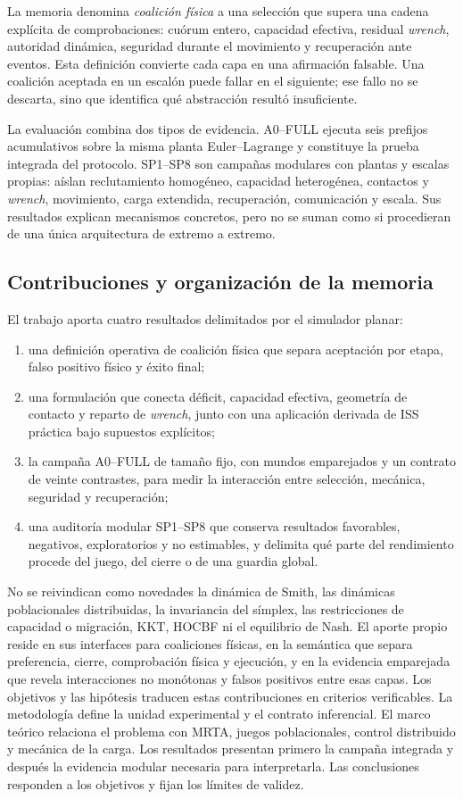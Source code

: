 La memoria denomina \emph{coalición física} a una selección que supera una cadena explícita de comprobaciones: cuórum entero, capacidad efectiva, residual \emph{wrench}, autoridad dinámica, seguridad durante el movimiento y recuperación ante eventos. Esta definición convierte cada capa en una afirmación falsable. Una coalición aceptada en un escalón puede fallar en el siguiente; ese fallo no se descarta, sino que identifica qué abstracción resultó insuficiente.

La evaluación combina dos tipos de evidencia. A0--FULL ejecuta seis prefijos acumulativos sobre la misma planta Euler--Lagrange y constituye la prueba integrada del protocolo. SP1--SP8 son campañas modulares con plantas y escalas propias: aíslan reclutamiento homogéneo, capacidad heterogénea, contactos y \emph{wrench}, movimiento, carga extendida, recuperación, comunicación y escala. Sus resultados explican mecanismos concretos, pero no se suman como si procedieran de una única arquitectura de extremo a extremo.



\subsection{Contribuciones y organización de la memoria}

El trabajo aporta cuatro resultados delimitados por el simulador planar:
\begin{enumerate}[label=A\arabic*.,leftmargin=2.2em]
  \item una definición operativa de coalición física que separa aceptación por etapa, falso positivo físico y éxito final;
  \item una formulación que conecta déficit, capacidad efectiva, geometría de contacto y reparto de \emph{wrench}, junto con una aplicaci\'on derivada de ISS pr\'actica bajo supuestos expl\'icitos;
  \item la campaña A0--FULL de tamaño fijo, con mundos emparejados y un contrato de veinte contrastes, para medir la interacción entre selección, mecánica, seguridad y recuperación;
  \item una auditoría modular SP1--SP8 que conserva resultados favorables, negativos, exploratorios y no estimables, y delimita qué parte del rendimiento procede del juego, del cierre o de una guardia global.
\end{enumerate}
No se reivindican como novedades la dinámica de Smith, las dinámicas poblacionales distribuidas, la invariancia del símplex, las restricciones de capacidad o migración, KKT, HOCBF ni el equilibrio de Nash. El aporte propio reside en sus interfaces para coaliciones físicas, en la semántica que separa preferencia, cierre, comprobación física y ejecución, y en la evidencia emparejada que revela interacciones no monótonas y falsos positivos entre esas capas.
Los objetivos y las hipótesis traducen estas contribuciones en criterios verificables. La metodología define la unidad experimental y el contrato inferencial. El marco teórico relaciona el problema con MRTA, juegos poblacionales, control distribuido y mecánica de la carga. Los resultados presentan primero la campaña integrada y después la evidencia modular necesaria para interpretarla. Las conclusiones responden a los objetivos y fijan los límites de validez.

